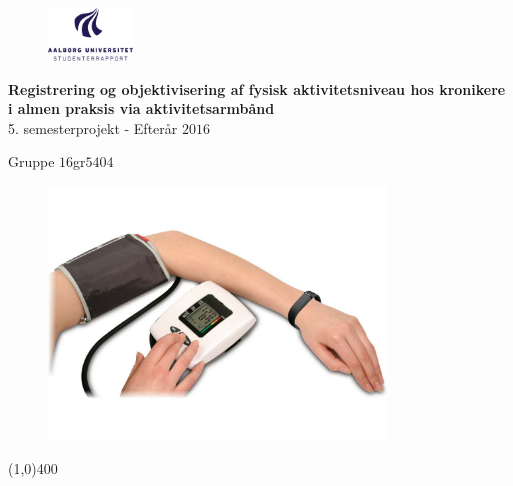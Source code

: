 \clearpage
\thispagestyle{empty}

\begin{figure}[H]
	\raggedleft
		\includegraphics[width=0.2\textwidth]{figures/aaulogo-da.png}
\end{figure} 
\vspace*{\fill} 
\begin{center}
\begin{Huge}
\textbf{Registrering og objektivisering af fysisk aktivitetsniveau hos kronikere i almen praksis via aktivitetsarmbånd}\\
\vspace{5 mm}
5. semesterprojekt - Efterår $2016$\\
\vspace{3 mm}
\end{Huge}
{\Large Gruppe $16$gr$5404$}
\begin{figure}[H]
	\centering
	\includegraphics[width=0.8\textwidth]{figures/forside}
\end{figure}	
\end{center}
\vspace*{\fill}

\begin{center}
\line(1,0){400}
\end{center}